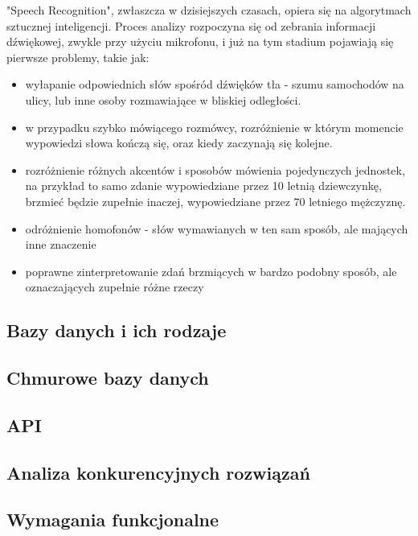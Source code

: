 \documentclass[12pt, a4paper]{article}
\begin{document}
\begin{sloppypar}
{{    "Speech Recognition", zwłaszcza w dzisiejszych czasach, opiera się na algorytmach
    sztucznej inteligencji. Proces analizy rozpoczyna się od zebrania informacji
    dźwiękowej, zwykle przy użyciu mikrofonu, i już na tym stadium pojawiają się
    pierwsze problemy, takie jak:
    \begin{itemize}
      \item wyłapanie odpowiednich słów spośród dźwięków tła - szumu samochodów na 
      ulicy, lub inne osoby rozmawiające w bliskiej odległości.
      \item w przypadku szybko mówiącego rozmówcy, rozróżnienie w którym momencie
      wypowiedzi słowa kończą się, oraz kiedy zaczynają się kolejne.
      \item rozróżnienie różnych akcentów i sposobów mówienia pojedynczych jednostek,
      na przykład to samo zdanie wypowiedziane przez 10 letnią dziewczynkę, brzmieć
      będzie zupełnie inaczej, wypowiedziane przez 70 letniego mężczyznę. 
      \item odróżnienie homofonów - słów wymawianych w ten sam sposób, ale mających
      inne znaczenie
      \item poprawne zinterpretowanie zdań brzmiących w bardzo podobny sposób, ale
      oznaczających zupełnie różne rzeczy
    \end{itemize} 


  }
  \subsection{Bazy danych i ich rodzaje}
  {

  }
  \subsection{Chmurowe bazy danych}
  {

  }
  \subsection{API}
  {

  }
  \subsection{Analiza konkurencyjnych rozwiązań}
  {

  }
  \subsection{Wymagania funkcjonalne}
  {

}}
\end{sloppypar}
\end{document}

